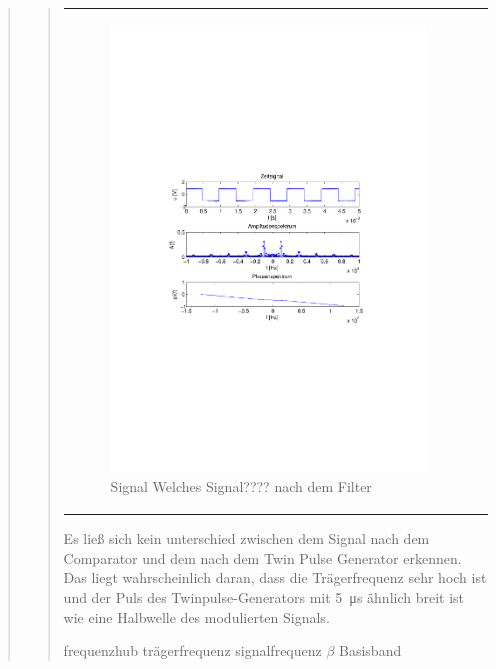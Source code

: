 \begin{quote}
\begin{quote}
\begin{center}
\begin{tabular}{ll}
                \begin{minipage}{0.67\textwidth}
                    \begin{figure}[H]
                        \label{fig:nach Filter}
                        \includegraphics[scale=0.7, trim = 35mm 100mm 35mm 95mm, clip]{Bilder/f1filA}
                        \caption{Signal Welches Signal???? nach dem Filter	}
                    \end{figure}
                \end{minipage}
            
            \end{tabular}
            \end{center}
        
        
        Es ließ sich kein unterschied zwischen dem Signal nach dem Comparator und dem nach dem Twin Pulse Generator erkennen. Das
        liegt wahrscheinlich daran, dass die Trägerfrequenz sehr hoch ist und der Puls des Twinpulse-Generators mit
        \SI{5}{\micro\second} ähnlich breit ist wie eine Halbwelle des modulierten Signals.
        
        frequenzhub
        trägerfrequenz
        signalfrequenz
        $\beta$
        Basisband
        
        
        
    \end{quote}
    
\end{quote}



